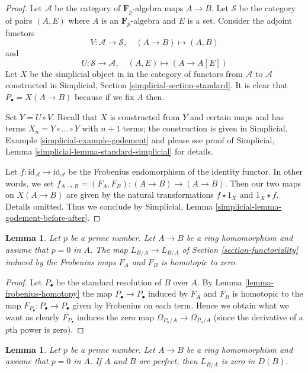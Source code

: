\documentclass{stacks-project}
\theoremstyle{plain}
\newtheorem{lemma}[subsection]{Lemma}
\theoremstyle{definition}
\theoremstyle{remark}
\numberwithin{equation}{subsection}
\begin{document}
\begin{proof}
Let $\mathcal{A}$ be the category of $\mathbf{F}_p$-algebra maps
$A \to B$. Let $\mathcal{S}$ be the category of pairs $(A, E)$
where $A$ is an $\mathbf{F}_p$-algebra and $E$ is a set. Consider the
adjoint functors
$$
V : \mathcal{A} \to \mathcal{S}, \quad (A \to B) \mapsto (A, B)
$$
and
$$
U : \mathcal{S} \to \mathcal{A}, \quad (A, E) \mapsto (A \to A[E])
$$
Let $X$ be the simplicial object in 
in the category of functors from $\mathcal{A}$ to $\mathcal{A}$
constructed in Simplicial, Section \ref{simplicial-section-standard}.
It is clear that $P_\bullet = X(A \to B)$ because if we fix
$A$ then.

\medskip\noindent
Set $Y = U \circ V$. Recall that $X$ is constructed from $Y$
and certain maps and has terms $X_n = Y \circ \ldots \circ Y$
with $n + 1$ terms; the construction is given in
Simplicial, Example \ref{simplicial-example-godement} and please see
proof of Simplicial, Lemma \ref{simplicial-lemma-standard-simplicial}
for details.

\medskip\noindent
Let $f : \text{id}_\mathcal{A} \to \text{id}_\mathcal{A}$
be the Frobenius endomorphism of the identity functor.
In other words, we set $f_{A \to B} = (F_A, F_B) : (A \to B) \to (A \to B)$.
Then our two maps on $X(A \to B)$ are given by the natural transformations
$f \star 1_X$ and $1_X \star f$. Details omitted.
Thus we conclude by Simplicial, Lemma
\ref{simplicial-lemma-godement-before-after}.
\end{proof}

\begin{lemma}
\label{lemma-frobenius-acts-as-zero}
Let $p$ be a prime number. Let $A \to B$ be a ring homomorphism
and assume that $p = 0$ in $A$. The map $L_{B/A} \to L_{B/A}$
of Section \ref{section-functoriality} induced by the
Frobenius maps $F_A$ and $F_B$ is homotopic to zero.
\end{lemma}

\begin{proof}
Let $P_\bullet$ be the standard resolution of $B$ over $A$.
By Lemma \ref{lemma-frobenius-homotopy} the map $P_\bullet \to P_\bullet$
induced by $F_A$ and $F_B$ is homotopic to the map
$F_{P_\bullet} : P_\bullet \to P_\bullet$ given by
Frobenius on each term. Hence we obtain what we want as clearly
$F_{P_\bullet}$ induces the zero map $\Omega_{P_n/A} \to \Omega_{P_n/A}$
(since the derivative of a $p$th power is zero).
\end{proof}

\begin{lemma}
\label{lemma-perfect-zero}
Let $p$ be a prime number. Let $A \to B$ be a ring homomorphism
and assume that $p = 0$ in $A$. If $A$ and $B$ are perfect, then
$L_{B/A}$ is zero in $D(B)$.
\end{lemma}
\end{document}
